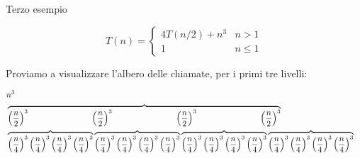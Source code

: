 \begin{frame}[shrink=5]{Terzo esempio}

\vspace{-6pt}
\begin{mybox}
\[
T(n) = \begin{cases}
     4T(n/2) + n^3 & n > 1 \\
     1 & n \leq 1
  \end{cases}
\]
\end{mybox}

Proviamo a visualizzare l'albero delle chiamate, per i primi tre livelli:

{\tiny
\begin{eqnarray*}
& n^3 &\\
&\overbrace{\mleft(\frac{n}{2}\mright)^3 \hspace{78pt} \mleft(\frac{n}{2}\mright)^3 \hspace{78pt} \mleft(\frac{n}{2}\mright)^3 \hspace{78pt} \mleft(\frac{n}{2}\mright)^3} & \\
& \overbrace{\mleft(\frac{n}{4}\mright)^3 \, \mleft(\frac{n}{4}\mright)^3 \, \mleft(\frac{n}{4}\mright)^3 \, \mleft(\frac{n}{4}\mright)^3} 
  \overbrace{\mleft(\frac{n}{4}\mright)^3 \, \mleft(\frac{n}{4}\mright)^3 \, \mleft(\frac{n}{4}\mright)^3 \, \mleft(\frac{n}{4}\mright)^3} 
  \overbrace{\mleft(\frac{n}{4}\mright)^3 \, \mleft(\frac{n}{4}\mright)^3 \, \mleft(\frac{n}{4}\mright)^3 \, \mleft(\frac{n}{4}\mright)^3} 
  \overbrace{\mleft(\frac{n}{4}\mright)^3 \, \mleft(\frac{n}{4}\mright)^3 \, \mleft(\frac{n}{4}\mright)^3 \, \mleft(\frac{n}{4}\mright)^3} &
\end{eqnarray*}
}

\end{frame}

